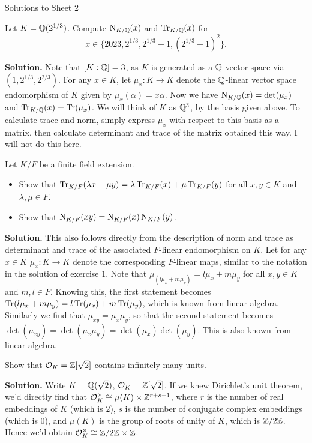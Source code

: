 \documentclass[a4paper,11pt]{article}
\begin{document}
\begin{center}
    \huge{Solutions to Sheet 2}
\end{center}

Let $K = \mathbb{Q}(2^{1/3})$. Compute $\operatorname{N}_{K/\mathbb{Q}}(x)$ and $\operatorname{Tr}_{K/\mathbb{Q}}(x)$ for 
$$ x \in \{2023, 2^{1/3}, 2^{1/3}-1, (2^{1/3}+1)^2\}.$$

\textbf{Solution.} Note that $[K:\mathbb{Q}] = 3$, as $K$ is generated as a $\mathbb{Q}$-vector
space via $(1,2^{1/3}, 2^{2/3})$. For any $x \in K$, let $\mu_x: K \to K$ denote
the $\mathbb{Q}$-linear vector space endomorphism of $K$ given by $\mu_x(\alpha) = x
\alpha$. Now we have 
$\operatorname{N}_{K/\mathbb{Q}}(x) = \det(\mu_x)$ and $\operatorname{Tr}_{K/\mathbb{Q}}(x) = \operatorname{Tr}(\mu_x)$. We will think
of $K$
as $\mathbb{Q}^3$, by the basis given above. To calculate trace and norm, simply
express $\mu_x$ with respect to this basis as a matrix, then calculate
determinant and trace of the matrix obtained this way. I will not do this here.

Let $K/F$ be a finite field extension. 

\begin{itemize}
    \item Show that $\operatorname{Tr}_{K/F}(\lambda x + \mu y) = \lambda \operatorname{Tr}_{K/F}(x) + \mu
        \operatorname{Tr}_{K/F}(y)$ for all $x,y \in K$ and $\lambda, \mu \in F$.
    \item Show that $\operatorname{N}_{K/F}(xy) = \operatorname{N}_{K/F}(x) \operatorname{N}_{K/F}(y)$.
\end{itemize}

\textbf{Solution.}
This also follows directly from the description of norm and trace as determinant
and trace of the associated $F$-linear endomorphism on $K$. Let for any $x \in K$
$\mu_x: K \to K$ denote the corresponding $F$-linear maps, similar to
the notation in the solution of exercise $1$. Note that
$\mu_{(l \mu_x + m \mu_y)} = l \mu_x + m \mu_y$ for all $x,y \in K$ and $m,l
\in F$. Knowing this, the first
statement becomes $\operatorname{Tr}(l \mu_x + m \mu_y) = l \operatorname{Tr}(\mu_x) + m \operatorname{Tr}(\mu_y)$, which
is known from linear algebra. Similarly we find that 
$\mu_{xy} = \mu_x \mu_y$, so that the second statement becomes 
$\det(\mu_{xy} )=  \det(\mu_x \mu_y) = \det(\mu_x) \det(\mu_y)$. This is also
known from linear algebra.

Show that $\mathcal{O}_K = \mathbb{Z}[\sqrt 2]$ contains infinitely many units.

\textbf{Solution.}
Write $K = \mathbb{Q}(\sqrt 2)$, $\mathcal{O}_K = \mathbb{Z}[\sqrt 2]$. If we knew Dirichlet's unit
theorem, we'd directly find that $\mathcal{O}_K^\times \cong \mu(K) \times \mathbb{Z}^{r+s-1}$,
where $r$ is the number of real embeddings of $K$ (which is $2$), $s$ is the
number of conjugate complex embeddings (which is $0$), and $\mu(K)$ is the
group of roots of unity of $K$, which is $\mathbb{Z}/2\mathbb{Z}$. Hence we'd obtain
$\mathcal{O}_K^\times \cong \mathbb{Z}/2\mathbb{Z} \times \mathbb{Z}$. 
\end{document}
